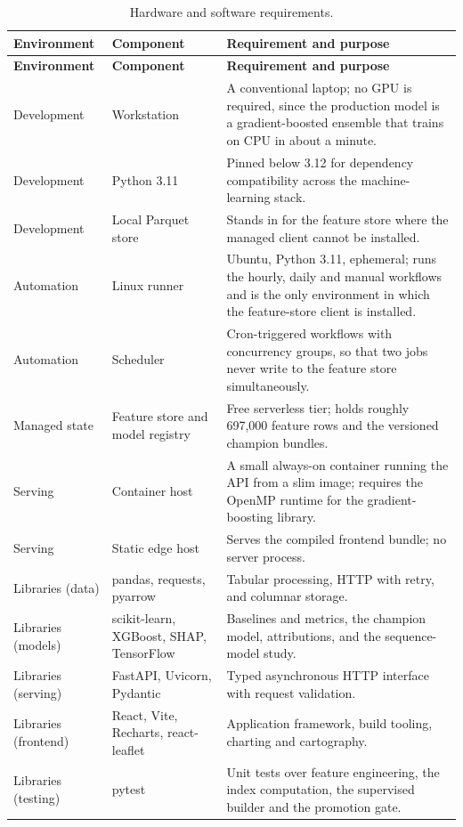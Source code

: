 \begin{xltabular}{\textwidth}{P{3.2cm} P{3.4cm} Y}
\caption{Hardware and software requirements.}\label{tab:platform}\\
\toprule
\bfseries Environment & \bfseries Component & \bfseries Requirement and purpose \\
\midrule
\endfirsthead
\toprule
\bfseries Environment & \bfseries Component & \bfseries Requirement and purpose \\
\midrule
\endhead
\bottomrule
\endlastfoot
Development & Workstation & A conventional laptop; no GPU is required, since the
production model is a gradient-boosted ensemble that trains on CPU in about a
minute. \\
Development & Python 3.11 & Pinned below 3.12 for dependency compatibility across
the machine-learning stack. \\
Development & Local Parquet store & Stands in for the feature store where the
managed client cannot be installed. \\
Automation & Linux runner & Ubuntu, Python 3.11, ephemeral; runs the hourly,
daily and manual workflows and is the only environment in which the feature-store
client is installed. \\
Automation & Scheduler & Cron-triggered workflows with concurrency groups, so
that two jobs never write to the feature store simultaneously. \\
Managed state & Feature store and model registry & Free serverless tier; holds
roughly 697,000 feature rows and the versioned champion bundles. \\
Serving & Container host & A small always-on container running the API from a
slim image; requires the OpenMP runtime for the gradient-boosting library. \\
Serving & Static edge host & Serves the compiled frontend bundle; no server
process. \\
Libraries (data) & pandas, requests, pyarrow & Tabular processing, HTTP with
retry, and columnar storage. \\
Libraries (models) & scikit-learn, XGBoost, SHAP, TensorFlow & Baselines and
metrics, the champion model, attributions, and the sequence-model study. \\
Libraries (serving) & FastAPI, Uvicorn, Pydantic & Typed asynchronous HTTP
interface with request validation. \\
Libraries (frontend) & React, Vite, Recharts, react-leaflet & Application
framework, build tooling, charting and cartography. \\
Libraries (testing) & pytest & Unit tests over feature engineering, the index
computation, the supervised builder and the promotion gate. \\
\end{xltabular}

